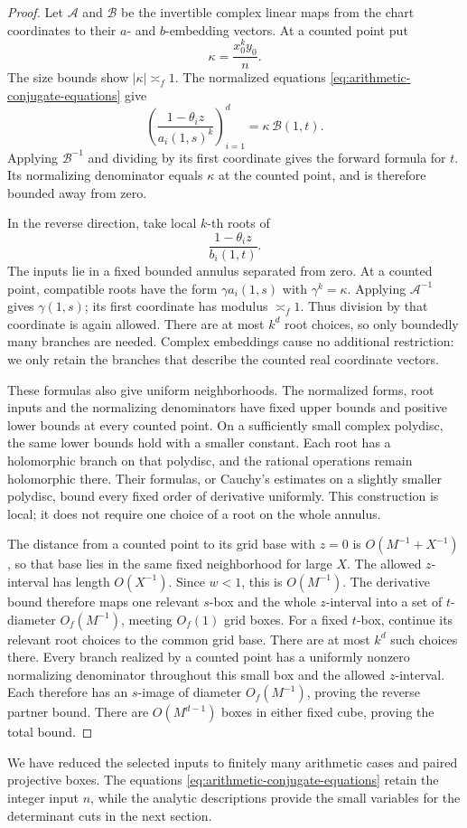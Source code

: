 \begin{proof}
Let $\mathcal A$ and $\mathcal B$ be the invertible complex linear maps
from the chart coordinates to their $a$- and $b$-embedding vectors.
At a counted point put
\[
 \kappa=\frac{x_0^k y_0}{n}.
\]
The size bounds show $|\kappa|\asymp_f1$.  The normalized equations
\eqref{eq:arithmetic-conjugate-equations} give
\begin{equation}\label{eq:arithmetic-chart-forward}
 \left(\frac{1-\theta_i z}{a_i(1,s)^k}\right)_{i=1}^d
 =\kappa\,\mathcal B(1,t).
\end{equation}
Applying $\mathcal B^{-1}$ and dividing by its first coordinate gives
the forward formula for $t$.  Its normalizing denominator equals
$\kappa$ at the counted point, and is therefore bounded away from zero.

In the reverse direction, take local $k$-th roots of
\[
 \frac{1-\theta_i z}{b_i(1,t)}.
\]
The inputs lie in a fixed bounded annulus separated from zero.  At a
counted point, compatible roots have the form
$\gamma a_i(1,s)$ with $\gamma^k=\kappa$.  Applying
$\mathcal A^{-1}$ gives $\gamma(1,s)$; its first coordinate has modulus
$\asymp_f1$.  Thus division by that coordinate is again allowed.  There
are at most $k^d$ root choices, so only boundedly many branches are
needed.  Complex embeddings cause no additional restriction: we only
retain the branches that describe the counted real coordinate vectors.

These formulas also give uniform neighborhoods.  The normalized forms,
root inputs and the normalizing denominators have fixed upper bounds
and positive lower bounds at every counted point.  On a sufficiently
small complex polydisc, the same lower bounds hold with a smaller
constant.  Each root has a holomorphic branch on that polydisc, and
the rational operations remain holomorphic there.  Their formulas, or
Cauchy's estimates on a slightly smaller polydisc, bound every fixed
order of derivative uniformly.  This construction is local; it does
not require one choice of a root on the whole annulus.

The distance from a counted point to its grid base with $z=0$ is
$O(M^{-1}+X^{-1})$, so that base lies in the same fixed neighborhood
for large $X$.  The allowed $z$-interval has length $O(X^{-1})$.
Since $w<1$, this is $O(M^{-1})$.  The derivative bound therefore
maps one relevant $s$-box and the whole $z$-interval into a set of
$t$-diameter $O_f(M^{-1})$, meeting $O_f(1)$ grid boxes.  For a fixed
$t$-box, continue its relevant root choices to the common grid base.
There are at most $k^d$ such choices there.  Every branch realized by
a counted point has a uniformly nonzero normalizing denominator
throughout this small box and the allowed $z$-interval.  Each therefore
has an $s$-image of diameter $O_f(M^{-1})$, proving the reverse
partner bound.
There are $O(M^{d-1})$ boxes in either fixed cube, proving the total
bound.
\end{proof}

We have reduced the selected inputs to finitely many arithmetic cases
and paired projective boxes.  The equations
\eqref{eq:arithmetic-conjugate-equations} retain the integer input $n$,
while the analytic descriptions provide the small variables for the
determinant cuts in the next section.
